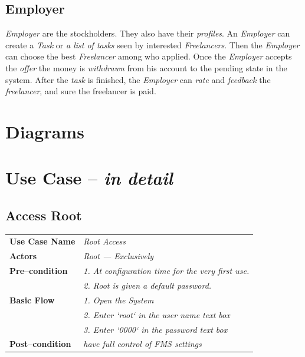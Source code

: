 \documentclass{article}
\begin{document}
\subsection{Employer}
\hspace{0.5cm} \textit{Employer} are the stockholders. They also have
their \textit{profiles}. An \textit{Employer} can create a \textit{Task} or
\textit{a list of tasks} seen  by interested \textit{Freelancers}.
Then the \textit{Employer} can choose the best \textit{Freelancer} among who
applied. Once the \textit{Employer} accepts the \textit{offer}
the money is \textit{withdrawn} from his account to the pending state in
the system. After the \textit{task} is finished, the \textit{Employer} can
\textit{rate} and \textit{feedback} the \textit{freelancer},
and sure the freelancer is paid.



\section {Diagrams}

\section{Use Case -- \textit{in detail}}
\subsection{Access Root}
    \begin{tabular}{ l | l }
    \toprule
      \rowcolor{LightCyan}
      \textbf{Use Case Name}    & \textit{Root Access}\\
      \textbf{Actors}           & \textit{Root --- Exclusively}\\
      \rowcolor{LightCyan}
      \textbf{Pre--condition}   & \textit{1. At configuration time for the very first use.} \\
      \rowcolor{LightCyan}
                                & \textit{2. Root is given a default password.}\\
      \textbf{Basic Flow}       & \textit{1. Open the System}\\
                                & \textit{2. Enter `root` in the user name text box}\\
                                & \textit{3. Enter `0000` in the password text box}\\
      \rowcolor{LightCyan}
      \textbf{Post--condition}  & \textit{have full control of FMS settings}\\
    \toprule
    \end{tabular}
\end{document}
